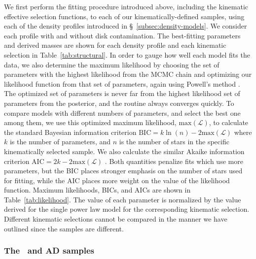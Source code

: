 We first perform the fitting procedure introduced above, including the kinematic effective selection functions, to each of our kinematically-defined \gse samples, using each of the density profiles introduced in \S~\ref{subsec:density-models}. We consider each profile with and without disk contamination. The best-fitting parameters and derived masses are shown for each density profile and each kinematic selection in Table~\ref{tab:structural}. In order to gauge how well each model fits the data, we also determine the maximum likelihood by choosing the set of parameters with the highest likelihood from the MCMC chain and optimizing our likelihood function from that set of parameters, again using Powell's method \parencite{powell64}. The optimized set of parameters is never far from the highest likelihood set of parameters from the posterior, and the routine always converges quickly. To compare models with different numbers of parameters, and select the best one among them, we use this optimized maximum likelihood, $\mathrm{max}(\mathcal{L})$, to calculate the standard Bayesian information criterion $\mathrm{BIC} = k\ln(n) - 2\mathrm{max}(\mathcal{L})$ \parencite{schwarz78} where $k$ is the number of parameters, and $n$ is the number of stars in the specific kinematically selected sample. We also calculate the similar Akaike information criterion $\mathrm{AIC} = 2k - 2\mathrm{max}(\mathcal{L})$ \parencite{akaike74}. Both quantities penalize fits which use more parameters, but the BIC places stronger emphasis on the number of stars used for fitting, while the AIC places more weight on the value of the likelihood function. Maximum likelihoods, BICs, and AICs are shown in Table~\ref{tab:likelihood}. The value of each parameter is normalized by the value derived for the single power law model for the corresponding kinematic selection. Different kinematic selections cannot be compared in the manner we have outlined since the samples are different.



\subsubsection{The \eLz\ and AD samples}
\label{subsubsec:eLz-and-AD-samples}

